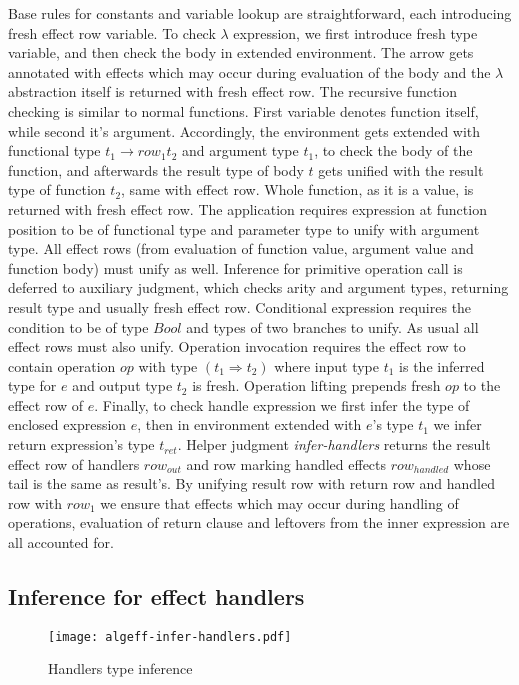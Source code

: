 \documentclass[inz, english, shortabstract]{iithesis}
\begin{document}
Base rules for constants and variable lookup are straightforward, each introducing fresh effect row variable.
To check $ \lambda $ expression, we first introduce fresh type variable, and then check the body in extended environment.
The arrow gets annotated with effects which may occur during evaluation of the body and the $ \lambda $ abstraction itself is returned with fresh effect row.
The recursive function checking is similar to normal functions.
First variable denotes function itself, while second it's argument.
Accordingly, the environment gets extended with functional type $ t_1 \rightarrow row_1 t_2 $ and argument type $ t_1 $, to check the body of the function, and afterwards the result type of body $ t $ gets unified with the result type of function $ t_2 $, same with effect row.
Whole function, as it is a value, is returned with fresh effect row.
The application requires expression at function position to be of functional type and parameter type to unify with argument type.
All effect rows (from evaluation of function value, argument value and function body) must unify as well.
Inference for primitive operation call is deferred to auxiliary judgment, which checks arity and argument types, returning result type and usually fresh effect row.
Conditional expression requires the condition to be of type $ Bool $ and types of two branches to unify.
As usual all effect rows must also unify.
Operation invocation requires the effect row to contain operation $ op $ with type $ (t_1 \Rightarrow t_2) $ where input type $ t_1 $ is the inferred type for $ e $ and output type $ t_2 $ is fresh.
Operation lifting prepends fresh $ op $ to the effect row of $ e $.
Finally, to check handle expression we first infer the type of enclosed expression $ e $, then in environment extended with $e$'s type $ t_1 $ we infer return expression's type $ t_{ret} $.
Helper judgment \textit{infer-handlers} returns the result effect row of handlers $ row_{out} $ and row marking handled effects $ row_{handled} $ whose tail is the same as result's.
By unifying result row with return row and handled row with $ row_1 $ we ensure that effects which may occur during handling of operations, evaluation of return clause and leftovers from the inner expression are all accounted for.

\subsection{Inference for effect handlers}

\begin{figure}
  \centering
  \texttt{[image: algeff-infer-handlers.pdf]}
  \caption{Handlers type inference} 
  \label{fig:algeff-infer-handlers} 
\end{figure} 
\end{document}

